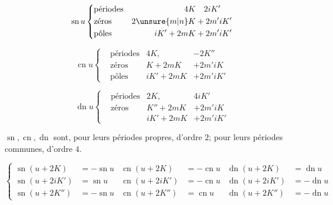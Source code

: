 \[
\operatorname{sn} u\left\{\begin{aligned}
&\text{périodes}&4K&\quad 2iK'\\
&\text{zéros}&2\unsure{m|n}K&+2m'iK'\\
&\text{pôles}&iK'+2mK&+2m'iK'
\end{aligned}\right.
\]


\[
\operatorname{cn} u\left\{\begin{aligned}
&\text{périodes}&4K,&-2K''\\
&\text{zéros}&K+2mK&+2m'iK\\
&\text{pôles}&iK'+2mK&+2m'iK'
\end{aligned}\right.
\]


\[
\operatorname{dn} u\left\{\begin{aligned}
&\text{périodes}&2K,&4iK'\\
&\text{zéros}&K''+2mK&+2m'iK\\
&&iK'+2mK&+2m'iK'
\end{aligned}\right.
\]


$\operatorname{sn},\operatorname{cn},\operatorname{dn}$ sont, pour leurs périodes propres, d'ordre $2$; pour leurs périodes communes, d'ordre $4$.

\[
\left\{\begin{aligned}
\operatorname{sn}(u+2K)&=-\operatorname{sn} u&\operatorname{cn}(u+2K)&=-\operatorname{cn} u&\operatorname{dn}(u+2K)&=\operatorname{dn} u\\
\operatorname{sn}(u+2iK')&=\operatorname{sn} u&\operatorname{cn}(u+2iK')&=-\operatorname{cn} u&\operatorname{dn}(u+2iK')&=-\operatorname{dn} u\\
\operatorname{sn}(u+2K'')&=-\operatorname{sn} u&\operatorname{cn}(u+2K'')&=\operatorname{cn} u&\operatorname{dn}(u+2K'')&=-\operatorname{dn} u
\end{aligned}\right.
\]

